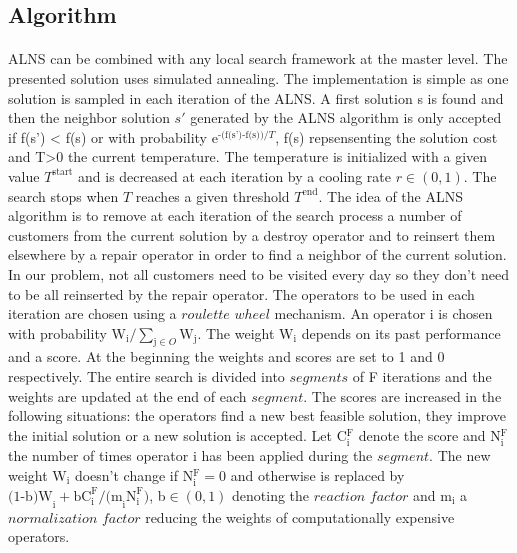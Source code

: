 \documentclass[12pt,a4paper]{article}
\begin{document}
\subsection{Algorithm}
\paragraph{}
ALNS can be combined with any local search framework at the master level. The presented solution uses simulated annealing. The implementation is simple as one solution is sampled in each iteration of the ALNS. A first solution s is found and then the neighbor solution $s'$ generated by the ALNS algorithm is only accepted if f(s') < f(s) or with probability $\text{e}^{\text{-(f(s')-f(s))}/T}$, f(s) repsensenting the solution cost and T>0 the current temperature. The temperature is initialized with a given value $T^{\text{start}}$ and is decreased at each iteration by a cooling rate $r\in(0,1)$. The search stops when $T$ reaches a given threshold $T^{\text{end}}$. The idea of the ALNS algorithm is to remove at each iteration of the search process a number of customers from the current solution by a destroy operator and to reinsert them elsewhere by a repair operator in order to find a neighbor of the current solution. In our problem, not all customers need to be visited every day so they don't need to be all reinserted by the repair operator. The operators to be used in each iteration are chosen using a $roulette$ $wheel$ mechanism. An operator i is chosen with probability W$_{\text{i}}/\sum_{\text{j}\in O}\text{W}_{\text{j}}$. The weight W$_{\text{i}}$ depends on its past performance and a score. At the beginning the weights and scores are set to 1 and 0 respectively. The entire search is divided into $segments$ of F iterations and the weights are updated at the end of each $segment$. The scores are increased in the following situations: the operators find a new best feasible solution, they improve the initial solution  or a new solution is accepted. Let C$_{\text{i}}^{\text{F}}$ denote the score and N$_{\text{i}}^{\text{F}}$ the number of times operator i has been applied during the $segment$. The new weight W$_{\text{i}}$ doesn't change if N$_{\text{i}}^{\text{F}} = 0$ and otherwise is replaced by $\text{(1-b)W}_{\text{i}}+\text{bC}_{\text{i}}^{\text{F}}/\text{(m}_{\text{i}}\text{N}_{\text{i}}^{\text{F}})$, b$\in (0,1)$ denoting the $reaction$ $factor$ and m$_{\text{i}}$ a $normalization$ $factor$ reducing the weights of computationally expensive operators. 
\end{document}
